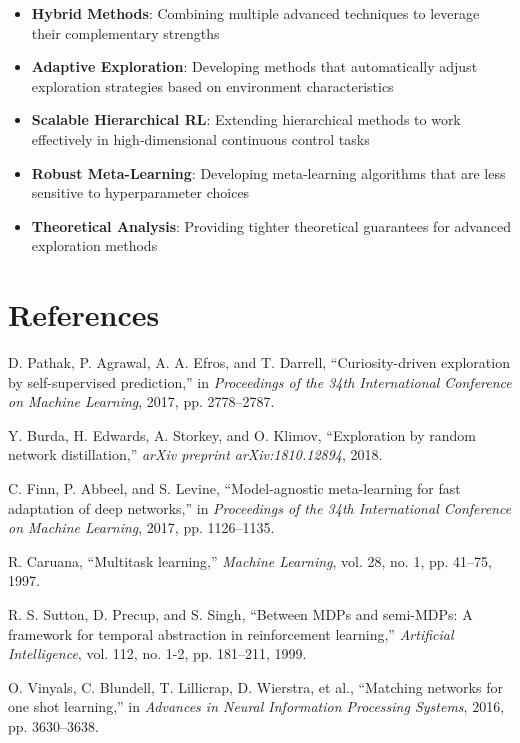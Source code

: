 \documentclass[12pt]{article}
\begin{document}
{{{\begin{itemize}
\item \textbf{Hybrid Methods}: Combining multiple advanced techniques to leverage their complementary strengths
\item \textbf{Adaptive Exploration}: Developing methods that automatically adjust exploration strategies based on environment characteristics
\item \textbf{Scalable Hierarchical RL}: Extending hierarchical methods to work effectively in high-dimensional continuous control tasks
\item \textbf{Robust Meta-Learning}: Developing meta-learning algorithms that are less sensitive to hyperparameter choices
\item \textbf{Theoretical Analysis}: Providing tighter theoretical guarantees for advanced exploration methods
\end{itemize}

\section{References}

\begin{thebibliography}{99}

D. Pathak, P. Agrawal, A. A. Efros, and T. Darrell, ``Curiosity-driven exploration by self-supervised prediction,'' in \textit{Proceedings of the 34th International Conference on Machine Learning}, 2017, pp. 2778--2787.

Y. Burda, H. Edwards, A. Storkey, and O. Klimov, ``Exploration by random network distillation,'' \textit{arXiv preprint arXiv:1810.12894}, 2018.

C. Finn, P. Abbeel, and S. Levine, ``Model-agnostic meta-learning for fast adaptation of deep networks,'' in \textit{Proceedings of the 34th International Conference on Machine Learning}, 2017, pp. 1126--1135.

R. Caruana, ``Multitask learning,'' \textit{Machine Learning}, vol. 28, no. 1, pp. 41--75, 1997.

R. S. Sutton, D. Precup, and S. Singh, ``Between MDPs and semi-MDPs: A framework for temporal abstraction in reinforcement learning,'' \textit{Artificial Intelligence}, vol. 112, no. 1-2, pp. 181--211, 1999.

O. Vinyals, C. Blundell, T. Lillicrap, D. Wierstra, et al., ``Matching networks for one shot learning,'' in \textit{Advances in Neural Information Processing Systems}, 2016, pp. 3630--3638.


\end{thebibliography}}}}
\end{document}

